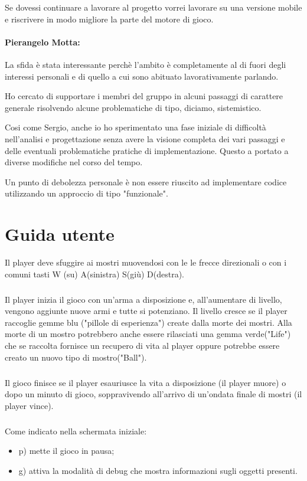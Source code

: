 \documentclass[a4paper,12pt]{report}
\begin{document}
Se dovessi continuare a lavorare al progetto vorrei lavorare su una versione mobile e riscrivere in modo migliore la parte del motore di gioco.

\subsubsection*{Pierangelo Motta:}

La sfida è stata interessante perchè l'ambito è completamente al di fuori degli interessi personali e di quello a cui sono abituato lavorativamente parlando.

Ho cercato di supportare i membri del gruppo in alcuni passaggi di carattere generale risolvendo alcune problematiche di tipo, diciamo, sistemistico.

Cosi come Sergio, anche io ho sperimentato una fase iniziale di difficoltà nell'analisi e progettazione senza avere la visione completa dei vari passaggi e delle eventuali problematiche pratiche di implementazione. Questo a portato a diverse modifiche nel corso del tempo.

Un punto di debolezza personale è non essere riuscito ad implementare codice utilizzando un approccio di tipo "funzionale".
\paragraph{}

\appendix
\chapter{Guida utente}

Il player deve sfuggire ai mostri muovendosi con le le frecce direzionali o con i comuni tasti W (su) A(sinistra) S(giù) D(destra).
\paragraph{}
Il player inizia il gioco con un'arma a disposizione e, all'aumentare di livello, vengono aggiunte nuove armi e tutte si potenziano.
%
Il livello cresce se il player raccoglie gemme blu ("pillole di esperienza") create dalla morte dei mostri.
Alla morte di un mostro potrebbero anche essere rilasciati una gemma verde("Life") che se raccolta fornisce un recupero di vita al player oppure potrebbe essere creato un nuovo tipo di mostro("Ball").
\paragraph{}
Il gioco finisce se il player esauriusce la vita a disposizione (il player muore) o dopo un minuto di gioco, soppravivendo all'arrivo di un'ondata finale di mostri (il player vince).
\paragraph{}
Come indicato nella schermata iniziale:
\begin{itemize}
\item p) mette il gioco in pausa;
\item g) attiva la modalità di debug che mostra informazioni sugli oggetti presenti.
\end{itemize}


% 
% 
\end{document}
